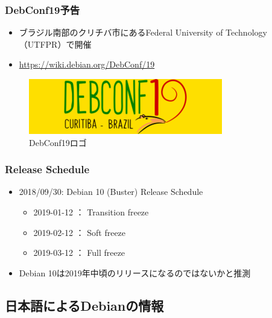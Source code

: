 \documentclass[mingoth,a4paper]{jsarticle}
\begin{document}
\subsubsection{DebConf19予告}

\begin{itemize}
  \item ブラジル南部のクリチバ市にあるFederal University of Technology（UTFPR）で開催
  \item \url{https://wiki.debian.org/DebConf/19}
\end{itemize}
\begin{figure}[htbp]
  \begin{center}
    \includegraphics[scale=1.0]{image201810/dc-19-logo.png}
  \end{center}
  \caption{DebConf19ロゴ}
\end{figure}


\subsubsection{Release Schedule}

\begin{itemize}
\item 2018/09/30:  Debian 10 (Buster) Release Schedule
  \begin{itemize}
  \item 2019-01-12 ： Transition freeze
  \item 2019-02-12 ： Soft freeze
  \item 2019-03-12 ： Full freeze
  \end{itemize}
\item Debian 10は2019年中頃のリリースになるのではないかと推測
\end{itemize}


\subsection{日本語によるDebianの情報}
\end{document}

